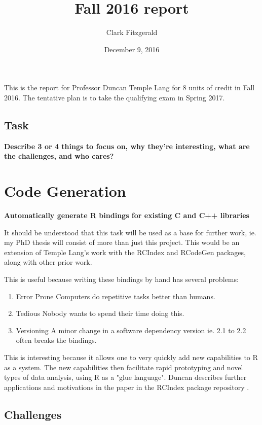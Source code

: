 \documentclass[12pt]{article}
\begin{document}
\title{Fall 2016 report}
\date{December 9, 2016}
\author{Clark Fitzgerald}
\maketitle

This is the report for Professor Duncan Temple Lang for 8 units of
credit in Fall 2016.  The tentative plan is to take the qualifying exam in
Spring 2017.

\subsection*{Task}
\textbf{Describe 3 or 4 things to focus on, why they're interesting, what are the
challenges, and who cares?}


\section{Code Generation}

\textbf{Automatically generate R bindings for existing C and C++ libraries}

It should be understood that
this task will be used as a base for further work, ie. my PhD thesis will consist
of more than just this project.  This would be an extension of Temple Lang's
work with the RCIndex \cite{R-RCIndex} and RCodeGen \cite{R-RCodegen}
packages, along with other prior work.

This is useful because writing these bindings by hand
has several problems: 
\begin{enumerate}
    \item{Error Prone} Computers do repetitive tasks better than humans.
    \item{Tedious} Nobody wants to spend their time doing this.
    \item{Versioning} A minor change in a software dependency version ie. 2.1
        to 2.2 often breaks the bindings.
\end{enumerate}

This is interesting because it allows one to very quickly add new
capabilities to R as a system. The new capabilities then facilitate rapid
prototyping and novel types of data analysis, using R as a "glue language".
Duncan describes further applications and motivations in the paper in
the RCIndex package repository \cite{R-RCIndex}.

\subsection{Challenges}
\end{document}
